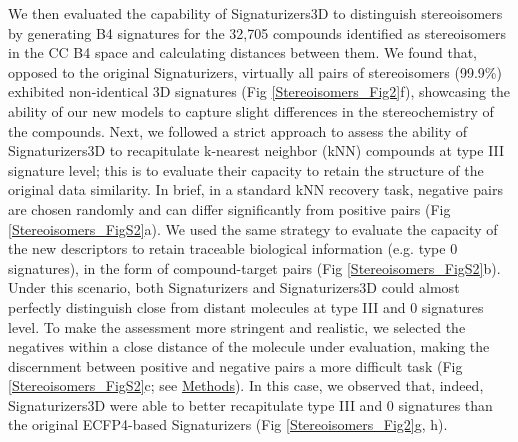 We then evaluated the capability of Signaturizers3D to distinguish stereoisomers by generating B4 signatures for the 32,705 compounds identified as stereoisomers in the CC B4 space and calculating distances between them. We found that, opposed to the original Signaturizers, virtually all pairs of stereoisomers (99.9\%) exhibited non-identical 3D signatures (Fig \ref{Stereoisomers_Fig2}f), showcasing the ability of our new models to capture slight differences in the stereochemistry of the compounds. Next, we followed a strict approach to assess the ability of Signaturizers3D to recapitulate k-nearest neighbor (kNN) compounds at type III signature level; this is to evaluate their capacity to retain the structure of the original data similarity. In brief, in a standard kNN recovery task, negative pairs are chosen randomly and can differ significantly from positive pairs (Fig \ref{Stereoisomers_FigS2}a). We used the same strategy to evaluate the capacity of the new descriptors to retain traceable biological information (e.g. type 0 signatures), in the form of compound-target pairs (Fig \ref{Stereoisomers_FigS2}b). Under this scenario, both Signaturizers and Signaturizers3D could almost perfectly distinguish close from distant molecules at type III and 0 signatures level. To make the assessment more stringent and realistic, we selected the negatives within a close distance of the molecule under evaluation, making the discernment between positive and negative pairs a more difficult task (Fig \ref{Stereoisomers_FigS2}c; see \hyperref[Stereoisomers_Methods]{Methods}). In this case, we observed that, indeed, Signaturizers3D were able to better recapitulate type III and 0 signatures than the original ECFP4-based Signaturizers (Fig \ref{Stereoisomers_Fig2}g, h).


